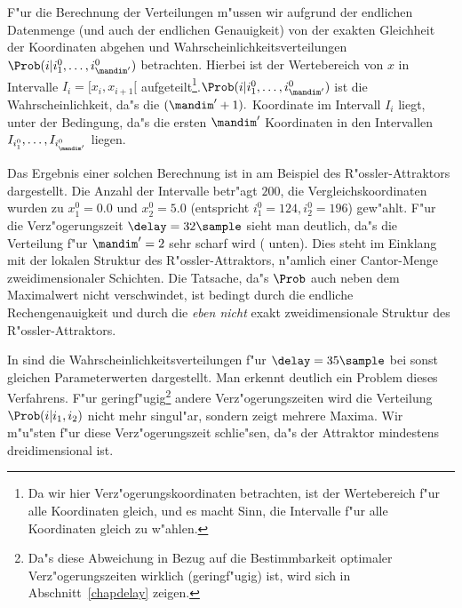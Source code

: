 F"ur die Berechnung der Verteilungen m"ussen wir aufgrund der endlichen Datenmenge (und
auch der endlichen Genauigkeit) von der exakten Gleichheit der Koordinaten abgehen und
Wahrscheinlichkeitsverteilungen $\Prob(i\vert i^0_1,\dots,i^0_{\mandim'})$ betrachten.
Hierbei ist der Wertebereich von $x$ in Intervalle $I_i=[x_i,x_{i+1}[$
aufgeteilt\footnote{Da wir hier Verz"ogerungskoordinaten betrachten, ist der Wertebereich
  f"ur alle Koordinaten gleich, und es macht Sinn, die Intervalle f"ur alle Koordinaten
  gleich zu w"ahlen.}.\@ $\Prob(i\vert i^0_1,\dots,i^0_{\mandim'})$ ist die
Wahrscheinlichkeit, da"s die $(\mandim'+1).$ Koordinate im Intervall $I_i$ liegt, unter der
Bedingung, da"s die ersten $\mandim'$ Koordinaten in den Intervallen
$I_{i^0_1},\dots,I_{i^0_{\mandim'}}$ liegen.



Das Ergebnis einer solchen Berechnung ist in  am Beispiel des
R"ossler-Attraktors dargestellt. Die Anzahl der Intervalle betr"agt $200$, die
Vergleichskoordinaten wurden zu $x^0_1=0.0$ und $x^0_2=5.0$ (entspricht $i^0_1=124,
i^0_2=196$) gew"ahlt. F"ur die Verz"ogerungszeit $\delay=32\sample$ 
sieht man deutlich, da"s die Verteilung f"ur $\mandim'=2$ sehr scharf wird ( unten). Dies steht im
Einklang mit der lokalen Struktur des R"ossler-Attraktors, n"amlich einer Cantor-Menge
zweidimensionaler Schichten. Die Tatsache, da"s $\Prob$ auch neben dem Maximalwert nicht
verschwindet, ist  bedingt durch die endliche Rechengenauigkeit und durch
die \emph{eben nicht} exakt zweidimensionale Struktur des R"ossler-Attraktors.

In  sind die Wahrscheinlichkeitsverteilungen f"ur
$\delay=35\sample$ bei sonst gleichen Parameterwerten dargestellt. Man erkennt deutlich ein
Problem dieses Verfahrens. F"ur geringf"ugig\footnote{Da"s diese Abweichung in Bezug auf
  die Bestimmbarkeit optimaler Verz"ogerungszeiten wirklich \begriff(geringf"ugig) ist,
  wird sich in Abschnitt~\ref{chapdelay} zeigen.} andere Verz"ogerungszeiten wird die
Verteilung $\Prob(i\vert i_1,i_2)$ nicht mehr singul"ar, sondern zeigt mehrere Maxima. Wir
m"u"sten f"ur diese Verz"ogerungszeit schlie"sen, da"s der Attraktor mindestens
dreidimensional ist.





